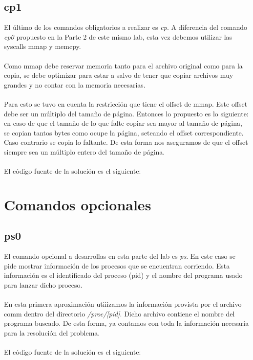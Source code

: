 \documentclass[a4paper, 12pt]{article}
\begin{document}
		\subsection{cp1}
		El último de los comandos obligatorios a realizar es \textit{cp}. A diferencia del comando \textit{cp0} propuesto en la Parte 2 de este mismo lab, esta vez debemos utilizar las syscalls mmap y memcpy.\\\\
		Como mmap debe reservar memoria tanto para el archivo original como para la copia, se debe optimizar para estar a salvo de tener que copiar archivos muy grandes y no contar con la memoria necesarias. \\\\
		Para esto se tuvo en cuenta la restricción que tiene el offset de mmap. Este offset debe ser un múltiplo del tamaño de página. Entonces lo propuesto es lo siguiente: en caso de que el tamaño de lo que falte copiar sea mayor al tamaño de página, se copian tantos bytes como ocupe la página, seteando el offset correspondiente. Caso contrario se copia lo faltante. De esta forma nos aseguramos de que el offset siempre sea un múltiplo entero del tamaño de página. \\\\
		El código fuente de la solución es el siguiente:
		
		\bigskip\bigskip\bigskip
		
		
	\newpage
	\section{Comandos opcionales}
		\subsection{ps0}
		El comando opcional a desarrollas en esta parte del lab es \textit{ps}. En este caso se pide mostrar información de los procesos que se encuentran corriendo. Esta información es el identificado del proceso (pid) y el nombre del programa usado para lanzar dicho proceso.\\\\
		En esta primera aproximación utiiizamos la información provista por el archivo comm dentro del directorio \textit{/proc/[pid]}. Dicho archivo contiene el nombre del programa buscado. De esta forma, ya contamos con toda la información necesaria para la resolución del problema. \\\\
		El código fuente de la solución es el siguiente:
		
		\bigskip\bigskip\bigskip
		
		
\end{document}
